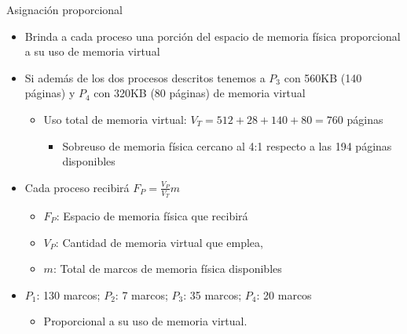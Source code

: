 \documentclass[presentation]{beamer}
\begin{document}
\begin{frame}[label={sec:orgb42fdc1}]{Asignación proporcional}
\begin{itemize}
\item Brinda a cada proceso una porción del espacio de memoria física
proporcional a su uso de memoria virtual
\item Si además de los dos procesos descritos tenemos a \(P_3\) con 560KB
(140 páginas) y \(P_4\) con 320KB (80 páginas) de memoria virtual
\begin{itemize}
\item Uso total de memoria virtual: \(V_T = 512 + 28 + 140 + 80 = 760\)
páginas
\begin{itemize}
\item Sobreuso de memoria física cercano al 4:1 respecto a las 194
páginas disponibles
\end{itemize}
\end{itemize}
\item Cada proceso recibirá \(F_P = \frac{V_P}{V_T} m\)
\begin{itemize}
\item \(F_P\): Espacio de memoria física que recibirá
\item \(V_P\): Cantidad de memoria virtual que emplea,
\item \(m\): Total de marcos de memoria física disponibles
\end{itemize}
\item \(P_1\): 130 marcos; \(P_2\): 7 marcos; \(P_3\): 35 marcos; \(P_4\): 20
marcos
\begin{itemize}
\item Proporcional a su uso de memoria virtual.
\end{itemize}
\end{itemize}
\end{frame}
\end{document}
